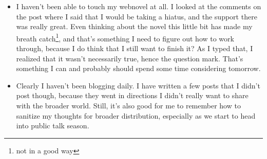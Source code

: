 \documentclass[12pt]{article}[titlepage]
\renewcommand{\,}{\textsuperscript{,}}
\begin{document}
\begin{itemize}
\item I haven't been able to touch my webnovel at all. I looked at the comments on the post where I said that I would be taking a hiatus, and the support there was really great.  
Even thinking about the novel this little bit has made my breath catch\footnote{not in a good way}, and that's something I need to figure out how to work through, because I do think that I still want to finish it? As I typed that, I realized that it wasn't necessarily true, hence the question mark.  
That's something I can and probably should spend some time considering tomorrow.  
\item Clearly I haven't been blogging daily.   
I have written a few posts that I didn't post though, because they went in directions I didn't really want to share with the broader world.  
Still, it's also good for me to remember how to sanitize my thoughts for broader distribution, especially as we start to head into public talk season.  
\end{itemize}
\end{document}
